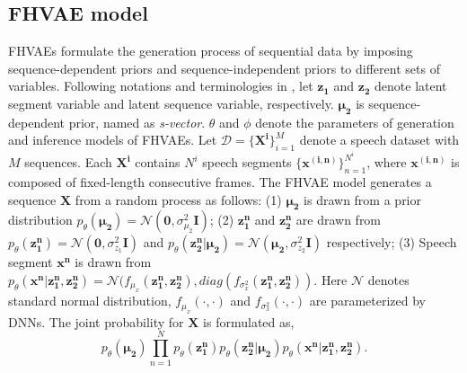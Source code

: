 \documentclass[a4paper]{article}
\begin{document}
\subsection{FHVAE model}
FHVAEs formulate the generation process of sequential data by imposing sequence-dependent priors and sequence-independent priors to different sets of variables. 
Following notations and terminologies in \cite{hsu2017nips}, 
let $\bm{z_1}$ and $\bm{z_2}$ denote latent segment variable and latent sequence variable, respectively. $\bm{\mu_2}$ is sequence-dependent prior, named as \emph{s-vector}. $\theta$ and $\phi$ denote the parameters of generation and inference models of FHVAEs.
Let $\mathcal{D}=\{\bm{X^{i}}\}_{i=1}^{M}$ denote a speech dataset with $M$ sequences. 
Each $\bm{X^i}$ contains $N^i$ speech segments $\{\bm{x^{(i,n)}}\}^{N^i}_{n=1}$, where $\bm{x^{(i,n)}}$ is composed of fixed-length consecutive 
frames. The FHVAE model generates a sequence $\bm{X}$ from a random process as follows: (1) $\bm{\mu_2 }$ is drawn from a prior distribution $p_{\theta}(\bm{\mu_2})=\mathcal{N} (\bm{0},\sigma^2_{\mu_2} \bm{I})$; (2) $\bm{z_1 ^{n}} $ and $\bm{z_2^{n}} $ are drawn from $p_{\theta}(\bm{z_1 ^{n}})=\mathcal{N} (\bm{0}, {\sigma^2_{z_1}} \bm{I})$ and  $p_{\theta}(\bm{z_2 ^{n}| \bm{\mu_2}})=\mathcal{N}(\bm{\mu_2}, {\sigma^2_{z_2}} \bm{I} )$ respectively; (3) Speech segment $\bm{x^{n}}$ is drawn from $p_{\theta}(\bm{x^{n}}|\bm{z_1 ^{n}, \bm{z_2^{n}}})=\mathcal{N}(f_{\mu_x} (\bm{z_1 ^{n}}, \bm{z_2^{n}}), diag(f_{\sigma^2_x} (\bm{z_1 ^{n}}, \bm{z_2^{n}}))$. Here $\mathcal{N}$ denotes standard normal distribution, $ f_{\mu_x} (\cdot, \cdot)$ and $ f_{\sigma^2_x} (\cdot, \cdot)$ are parameterized by DNNs.
The joint probability for $\bm{X}$ is formulated as,
\begin{equation}
    p_{\theta} (\bm{\mu_2})\prod_{n=1}^{N} p_{\theta} (\bm{z_1^n}) p_{\theta} (\bm{z_2^{n}}|\bm{\mu_2})p_{\theta} (\bm{x^n}|\bm{z_1 ^{n}, \bm{z_2^{n}}}).
\end{equation}
\end{document}
